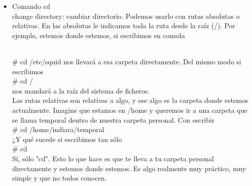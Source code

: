 \begin{itemize}
    \item Comando cd
    \\change directory: cambiar directorio. Podemos usarlo con rutas absolutas o relativas. En las absolutas le indicamos toda la ruta desde la raíz (/). Por ejemplo, estemos donde estemos, si escribimos en consola

\\# cd /etc/squid
nos llevará a esa carpeta directamente. Del mismo modo si escribimos
\\# cd /
\\nos mandará a la raíz del sistema de ficheros.
\\Las rutas relativas son relativas a algo, y ese algo es la carpeta donde estemos actualmente. Imagine que estamos en /home y queremos ir a una carpeta que se llama temporal dentro de nuestra carpeta personal. Con escribir
\\# cd /home/indiara/temporal
\\¿Y qué sucede si escribimos tan sólo
\\# cd
\\Sí, sólo "cd". Esto lo que hace es que te lleva a tu carpeta personal directamente y estemos donde estemos. Es algo realmente muy práctico, muy simple y que no todos conocen.

\end{itemize}


